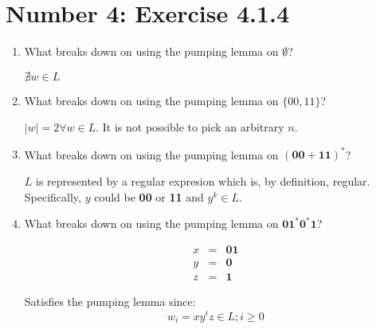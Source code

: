 \documentclass[12pt,a4paper,twoside]{article}  %
\begin{document}
\section{Number 4: Exercise 4.1.4}
\begin{enumerate}

\item What breaks down on using the pumping lemma on $\emptyset$?

$\nexists w \in L$

\item What breaks down on using the pumping lemma on $\{00, 11\}$?

$|w| = 2 \forall w \in L$. It is not possible to pick an arbitrary $n$.

\item What breaks down on using the pumping lemma on
$(\mathbf{00} + \mathbf{11})^*$?

$L$ is represented by a regular expresion which is, by definition,
regular. Specifically, $y$ could be {\bf 00} or {\bf 11} and
$y^k \in L$.

\item What breaks down on using the pumping lemma on
$\mathbf{01}^*\mathbf{0}^*\mathbf{1}$?

\begin{eqnarray}
x &=& \mathbf{01} \\
y &=& \mathbf{0}  \\
z &=& \mathbf{1}
\end{eqnarray}

Satisfies the pumping lemma since:
\begin{equation}
w_i = xy^iz \in L; i \geq 0
\end{equation}

\end{enumerate}
\end{document}
